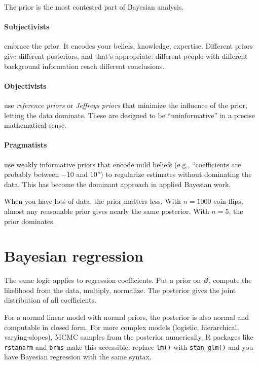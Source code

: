 The prior is the most contested part of Bayesian analysis.

\paragraph{Subjectivists} embrace the prior. It encodes your beliefs, knowledge, expertise. Different priors give different posteriors, and that's appropriate: different people with different background information reach different conclusions.

\paragraph{Objectivists} use \emph{reference priors} or \emph{Jeffreys priors} that minimize the influence of the prior, letting the data dominate. These are designed to be ``uninformative'' in a precise mathematical sense.

\paragraph{Pragmatists} use weakly informative priors that encode mild beliefs (e.g., ``coefficients are probably between $-10$ and $10$'') to regularize estimates without dominating the data. This has become the dominant approach in applied Bayesian work.

When you have lots of data, the prior matters less. With $n = 1000$ coin flips, almost any reasonable prior gives nearly the same posterior. With $n = 5$, the prior dominates.

\section{Bayesian regression}

The same logic applies to regression coefficients. Put a prior on $\bm{\beta}$, compute the likelihood from the data, multiply, normalize. The posterior gives the joint distribution of all coefficients.

For a normal linear model with normal priors, the posterior is also normal and computable in closed form. For more complex models (logistic, hierarchical, varying-slopes), MCMC samples from the posterior numerically. R packages like \texttt{rstanarm} and \texttt{brms} make this accessible: replace \texttt{lm()} with \texttt{stan\_glm()} and you have Bayesian regression with the same syntax.

